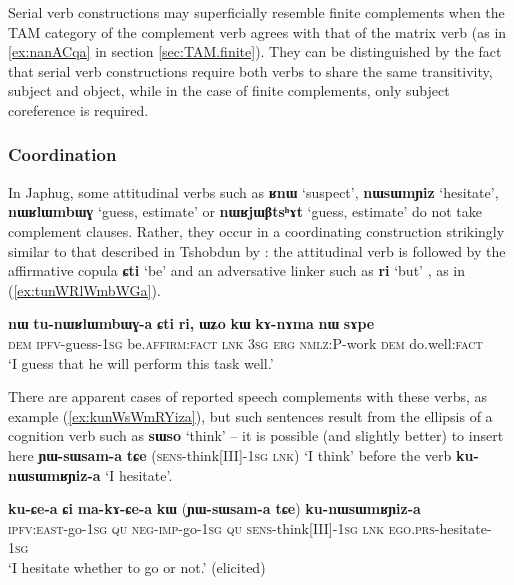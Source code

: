 \documentclass[oneside,a4paper,11pt]{article}
\newcommand{\ipa}[1]{\textbf{\phon#1}} %
\newcommand{\jpg}[2]{\ipa{#1} `#2'} %
\begin{document}
Serial verb constructions may superficially resemble finite complements when the TAM category of the complement verb agrees with that of the matrix verb (as in \ref{ex:nanACqa} in section \ref{sec:TAM.finite}). They can be distinguished by the fact that serial verb constructions require both verbs to share the same transitivity, subject and object, while in the case of finite complements, only subject coreference is required.

\subsubsection{Coordination} \label{sec:coordination}
In Japhug, some attitudinal verbs such as \jpg{ʁnɯ}{suspect}, \jpg{nɯsɯmɲiz}{hesitate}, \jpg{nɯʁlɯmbɯɣ}{guess, estimate} or \jpg{nɯʁjɯβtsʰɤt}{guess, estimate} do not take complement clauses. Rather, they occur in a coordinating construction strikingly similar to that described in Tshobdun  by \citet[487-8]{sun12complementation}: the attitudinal verb is followed by the affirmative copula \jpg{ɕti}{be} and an adversative linker such as \jpg{ri}{but} , as in (\ref{ex:tunWRlWmbWGa}).

\begin{exe}
\ex \label{ex:tunWRlWmbWGa}
\gll \ipa{nɯ} 	\ipa{tu-nɯʁlɯmbɯɣ-a} 	\ipa{ɕti} 	\ipa{ri,} 	\ipa{ɯʑo} 	\ipa{kɯ} 	\ipa{kɤ-nɤma} 	\ipa{nɯ} 	\ipa{sɤpe} \\
\textsc{dem} \textsc{ipfv}-guess-\textsc{1sg} be.\textsc{affirm:fact} \textsc{lnk} \textsc{3sg} \textsc{erg} \textsc{nmlz:P}-work \textsc{dem} do.well:\textsc{fact} \\
\glt `I guess that he will perform this task well.'
\end{exe}

There are apparent cases of reported speech complements with these verbs, as example (\ref{ex:kunWsWmRYiza}), but such sentences result from the ellipsis of a cognition verb such as \jpg{sɯso}{think} -- it is possible (and slightly better) to insert here \ipa{ɲɯ-sɯsam-a} 	\ipa{tɕe} (\textsc{sens}-think[III]-\textsc{1sg} \textsc{lnk}) `I think' before the verb \ipa{ku-nɯsɯmʁɲiz-a}  `I hesitate'.

\begin{exe}
\ex \label{ex:kunWsWmRYiza}
\gll 
\ipa{ku-ɕe-a} 	\ipa{ɕi} 	\ipa{ma-kɤ-ɕe-a} 	\ipa{kɯ} (\ipa{ɲɯ-sɯsam-a} 	\ipa{tɕe}) \ipa{ku-nɯsɯmʁɲiz-a} \\
\textsc{ipfv:east}-go-\textsc{1sg} \textsc{qu} \textsc{neg-imp}-go-\textsc{1sg} \textsc{qu} \textsc{sens}-think[III]-\textsc{1sg} \textsc{lnk} \textsc{ego.prs}-hesitate-\textsc{1sg} \\
\glt `I hesitate whether to go or not.' (elicited)
\end{exe}
\end{document}

